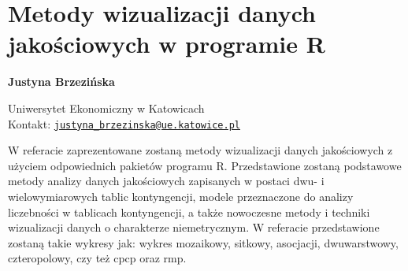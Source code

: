 \documentclass[\main/boa.tex]{subfiles}
\begin{document}
\section{Metody wizualizacji danych jakościowych w programie R}


\begin{minipage}{0.915\textwidth}
	\centering
  {\bf \huge {} Justyna Brzezińska}
\end{minipage}


\vskip 0.3cm

\begin{affiliations}
\begin{minipage}{0.915\textwidth}
\centering
\large Uniwersytet Ekonomiczny w Katowicach   \\[5pt]
Kontakt: \href{mailto:justyna_brzezinska@ue.katowice.pl}{\nolinkurl{justyna_brzezinska@ue.katowice.pl}}\\
\end{minipage}
\end{affiliations}

\vskip 0.8cm

W referacie zaprezentowane zostaną metody wizualizacji danych jakościowych z użyciem odpowiednich pakietów programu R. Przedstawione zostaną podstawowe metody analizy danych jakościowych zapisanych w postaci dwu- i wielowymiarowych tablic kontyngencji, modele przeznaczone do analizy liczebności w tablicach kontyngencji, a także nowoczesne metody i techniki wizualizacji danych o charakterze niemetrycznym. W referacie przedstawione zostaną takie wykresy jak: wykres mozaikowy, sitkowy, asocjacji, dwuwarstwowy, czteropolowy, czy też cpcp oraz rmp. 
\end{document}
